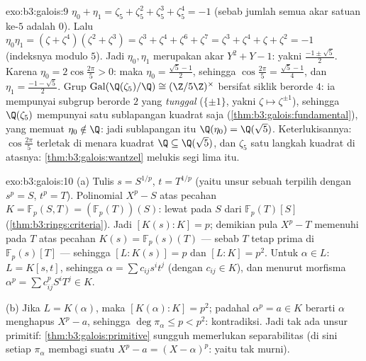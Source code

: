 \begin{solution}{exo:b3:galois:9}
$\eta_0 + \eta_1 = \zeta_5 + \zeta_5^2 + \zeta_5^3 + \zeta_5^4 =
-1$ (sebab jumlah semua akar satuan ke-$5$ adalah $0$). Lalu $\eta_0\eta_1 =
(\zeta + \zeta^4)(\zeta^2 + \zeta^3) = \zeta^3 + \zeta^4 +
\zeta^6 + \zeta^7 = \zeta^3 + \zeta^4 + \zeta + \zeta^2 = -1$
(indeksnya modulo $5$). Jadi $\eta_0, \eta_1$ merupakan akar $Y^2 + Y
- 1$: yakni $\frac{-1 \pm \sqrt5}2$. Karena $\eta_0 =
2\cos\frac{2\pi}5 > 0$: maka $\eta_0 = \frac{\sqrt5 - 1}2$, sehingga
$\cos\frac{2\pi}5 = \frac{\sqrt5 - 1}4$, dan $\eta_1 =
\frac{-1-\sqrt5}2$. Grup
$\operatorname{Gal}(\Q(\zeta_5)/\Q) \cong (\Z/5\Z)^\times$ bersifat
siklik berorde $4$: ia mempunyai subgrup berorde $2$ yang
\emph{tunggal} ($\{\pm 1\}$, yakni $\zeta \mapsto \zeta^{\pm1}$), sehingga
$\Q(\zeta_5)$ mempunyai satu sublapangan kuadrat saja
(\cref{thm:b3:galois:fundamental}), yang memuat $\eta_0
\notin \Q$: jadi sublapangan itu $\Q(\eta_0) = \Q(\sqrt5)$. Keterlukisannya:
$\cos\frac{2\pi}5$ terletak di menara kuadrat $\Q \subseteq
\Q(\sqrt5)$, dan $\zeta_5$ satu langkah kuadrat di atasnya:
\cref{thm:b3:galois:wantzel} melukis segi lima itu.
\end{solution}

\begin{solution}{exo:b3:galois:10}
(a) Tulis $s = S^{1/p}$, $t = T^{1/p}$ (yaitu unsur sebuah
 terpilih dengan $s^p = S$, $t^p = T$). Polinomial $X^p - S$
 atas pecahan $K = \mathbb F_p(S, T) = (\mathbb
F_p(T))(S)$: lewat  pada  $S$ dari
 $\mathbb F_p(T)[S]$ (\cref{thm:b3:rings:criteria}). Jadi
$[K(s):K] = p$; demikian pula $X^p - T$ memenuhi  pada $T$ atas
pecahan $K(s) = \mathbb F_p(s)(T)$ --- sebab $T$ tetap prima di
$\mathbb F_p(s)[T]$ --- sehingga $[L : K(s)] = p$ dan $[L:K] =
p^2$. Untuk $\alpha \in L$: $L = K[s, t]$, sehingga $\alpha = \sum
c_{ij}s^it^j$ (dengan $c_{ij} \in K$), dan menurut morfisma 
$\alpha^p = \sum c_{ij}^p S^iT^j \in K$.

(b) Jika $L = K(\alpha)$, maka $[K(\alpha):K] = p^2$; padahal
$\alpha^p = a \in K$ berarti $\alpha$ menghapus $X^p - a$, sehingga
$\deg\pi_\alpha \leq p < p^2$: kontradiksi. Jadi tak ada unsur primitif:
\cref{thm:b3:galois:primitive} sungguh memerlukan
separabilitas (di sini setiap $\pi_\alpha$ membagi suatu $X^p - a =
(X - \alpha)^p$: yaitu tak  murni).
\end{solution}

